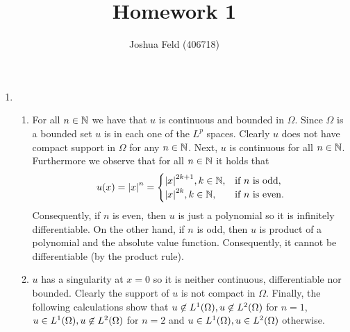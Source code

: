 \documentclass[english]{exercise}
\title{Homework 1}
\author{Joshua Feld (406718)}
\begin{document}
	\maketitle


	\section{}

	\begin{enumerate}
		\item
		\begin{enumerate}
			\item For all \(n \in \mathbb{N}\) we have that \(u\) is continuous and bounded in \(\Omega\).
			Since \(\Omega\) is a bounded set \(u\) is in each one of the \(L^p\) spaces.
			Clearly \(u\) does not have compact support in \(\Omega\) for any \(n \in \mathbb{N}\).
			Next, \(u\) is continuous for all \(n \in \mathbb{N}\).
			Furthermore we observe that for all \(n \in \mathbb{N}\) it holds that
			\[
				u\parentheses*{x} = \absolute*{x}^n = \begin{cases}
					\absolute*{x}^{2k + 1}, k \in \N, & \text{if }n\text{ is odd},\\
					\absolute*{x}^{2k}, k \in \N, & \text{if }n\text{ is even}.
				\end{cases}
			\]
			Consequently, if \(n\) is even, then \(u\) is just a polynomial so it is infinitely differentiable.
			On the other hand, if \(n\) is odd, then \(u\) is product of a polynomial and the absolute value function.
			Consequently, it cannot be differentiable (by the product rule).
			\item \(u\) has a singularity at \(x = 0\) so it is neither continuous, differentiable nor bounded.
			Clearly the support of \(u\) is not compact in \(\Omega\).
			Finally, the following calculations show that \(u \not\in L^1\parentheses*{\Omega}, u \not\in L^2\parentheses*{\Omega}\) for \(n = 1\), \(u \in L^1\parentheses*{\Omega}, u \not\in L^2\parentheses*{\Omega}\) for \(n = 2\) and \(u \in L^1\parentheses*{\Omega}, u \in L^2\parentheses*{\Omega}\) otherwise.


\end{enumerate}
\end{enumerate}
\end{document}
